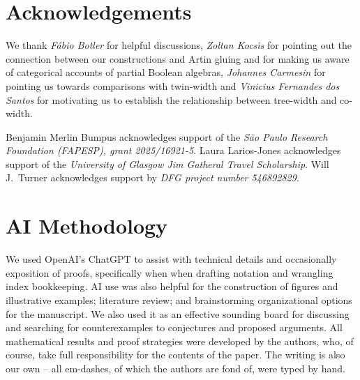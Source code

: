 \section*{Acknowledgements}

We thank \textit{Fábio Botler} for helpful discussions, \textit{Zoltan Kocsis} for pointing out the connection between our constructions and Artin gluing and for making us aware of categorical accounts of partial Boolean algebras, \textit{Johannes Carmesin} for pointing us towards comparisons with twin-width and \textit{Vinicius Fernandes dos Santos} for motivating us to establish the relationship between tree-width and co-width. 

Benjamin Merlin Bumpus acknowledges support of the \textit{São Paulo Research Foundation (FAPESP), grant 2025/16921-5}. Laura Larios-Jones acknowledges support of the \textit{University of Glasgow Jim Gatheral Travel Scholarship}. Will J.\ Turner acknowledges support by \textit{DFG project number 546892829}.

\section*{AI Methodology}
We used OpenAI's ChatGPT to assist with technical details and occasionally exposition of proofs, specifically when when drafting notation and wrangling index bookkeeping. AI use was also helpful for the construction of figures and illustrative examples; literature review; and brainstorming organizational options for the manuscript. We also used it as an effective sounding board for discussing and searching for counterexamples to conjectures and proposed arguments. All mathematical results and proof strategies were developed by the authors, who, of course, take full responsibility for the contents of the paper. The writing is also our own -- all em-dashes, of which the authors are fond of, were typed by hand. 
